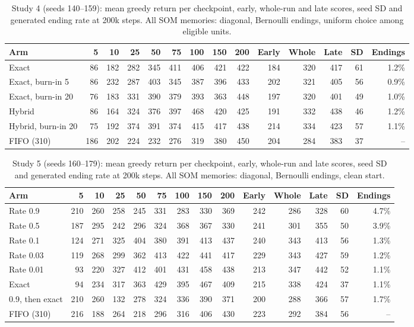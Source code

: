 \documentclass{article}
\begin{document}
\begin{table}[h]
\caption{Study 4 (seeds 140--159): mean greedy return per checkpoint, early,
whole-run and late scores, seed SD and generated ending rate at 200k steps.
All SOM memories: diagonal, Bernoulli endings, uniform choice among eligible
units.}
\label{tab:burnin-all}
\centering
\small
\begin{tabular}{lrrrrrrrrrrrrr}
\toprule
Arm & 5 & 10 & 25 & 50 & 75 & 100 & 150 & 200 & Early & Whole & Late & SD & Endings \\
\midrule
Exact & 86 & 182 & 282 & 345 & 411 & 406 & 421 & 422 & 184 & 320 & 417 & 61 & 1.2\% \\
Exact, burn-in 5 & 86 & 232 & 287 & 403 & 345 & 387 & 396 & 433 & 202 & 321 & 405 & 56 & 0.9\% \\
Exact, burn-in 20 & 76 & 183 & 331 & 390 & 379 & 393 & 363 & 448 & 197 & 320 & 401 & 49 & 1.0\% \\
Hybrid & 86 & 164 & 324 & 376 & 397 & 468 & 420 & 425 & 191 & 332 & 438 & 46 & 1.2\% \\
Hybrid, burn-in 20 & 75 & 192 & 374 & 391 & 374 & 415 & 417 & 438 & 214 & 334 & 423 & 57 & 1.1\% \\
FIFO (310) & 186 & 202 & 224 & 232 & 276 & 319 & 380 & 450 & 204 & 284 & 383 & 37 & -- \\
\bottomrule
\end{tabular}
\end{table}

\begin{table}[h]
\caption{Study 5 (seeds 160--179): mean greedy return per checkpoint, early,
whole-run and late scores, seed SD and generated ending rate at 200k steps.
All SOM memories: diagonal, Bernoulli endings, clean start.}
\label{tab:rate-all}
\centering
\small
\begin{tabular}{lrrrrrrrrrrrrr}
\toprule
Arm & 5 & 10 & 25 & 50 & 75 & 100 & 150 & 200 & Early & Whole & Late & SD & Endings \\
\midrule
Rate 0.9 & 210 & 260 & 258 & 245 & 331 & 283 & 330 & 369 & 242 & 286 & 328 & 60 & 4.7\% \\
Rate 0.5 & 187 & 295 & 242 & 296 & 324 & 368 & 367 & 330 & 241 & 301 & 355 & 50 & 3.9\% \\
Rate 0.1 & 124 & 271 & 325 & 404 & 380 & 391 & 413 & 437 & 240 & 343 & 413 & 56 & 1.3\% \\
Rate 0.03 & 119 & 268 & 299 & 362 & 413 & 422 & 441 & 417 & 229 & 343 & 427 & 59 & 1.2\% \\
Rate 0.01 & 93 & 220 & 327 & 412 & 401 & 431 & 458 & 438 & 213 & 347 & 442 & 52 & 1.1\% \\
Exact & 94 & 234 & 317 & 363 & 429 & 395 & 467 & 409 & 215 & 338 & 424 & 37 & 1.1\% \\
0.9, then exact & 210 & 260 & 132 & 278 & 324 & 336 & 390 & 371 & 200 & 288 & 366 & 57 & 1.7\% \\
FIFO (310) & 216 & 188 & 264 & 218 & 296 & 316 & 406 & 430 & 223 & 292 & 384 & 56 & -- \\
\bottomrule
\end{tabular}
\end{table}
\end{document}
